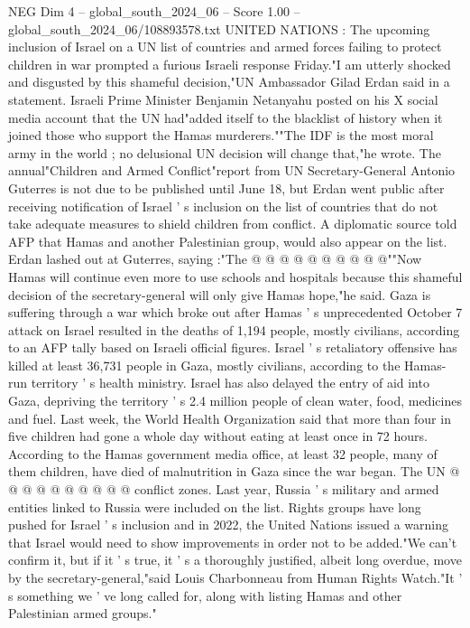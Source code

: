 \begin{textsample}{NEG Dim 4 – global\_south\_2024\_06 – Score 1.00 – global\_south\_2024\_06/108893578.txt}  \label{ex:f4_neg_377}
UNITED NATIONS : The upcoming inclusion of Israel on a UN list of countries and armed forces failing to protect children in war prompted a furious Israeli response Friday."I am utterly shocked and disgusted by this shameful decision,"UN Ambassador Gilad Erdan said in a statement.
Israeli Prime Minister Benjamin Netanyahu posted on his X social media account that the UN had"added itself to the blacklist of history when it joined those who support the Hamas murderers.""The IDF is the most moral army in the world ; no delusional UN decision will change that,"he wrote.
The annual"Children and Armed Conflict"report from UN Secretary-General Antonio Guterres is not due to be published until June 18, but Erdan went public after receiving notification of Israel ' s inclusion on the list of countries that do not take adequate measures to shield children from conflict.
A diplomatic source told AFP that Hamas and another Palestinian group, would also appear on the list.
Erdan lashed out at Guterres, saying :"The @ @ @ @ @ @ @ @ @ @""Now Hamas will continue even more to use schools and hospitals because this shameful decision of the secretary-general will only give Hamas hope,"he said.
Gaza is suffering through a war which broke out after Hamas ' s unprecedented October 7 attack on Israel resulted in the deaths of 1,194 people, mostly civilians, according to an AFP tally based on Israeli official figures.
Israel ' s retaliatory offensive has killed at least 36,731 people in Gaza, mostly civilians, according to the Hamas-run territory ' s health ministry.
Israel has also delayed the entry of aid into Gaza, depriving the territory ' s 2.4 million people of clean water, food, medicines and fuel.
Last week, the World Health Organization said that more than four in five children had gone a whole day without eating at least once in 72 hours.
According to the Hamas government media office, at least 32 people, many of them children, have died of malnutrition in Gaza since the war began.
The UN @ @ @ @ @ @ @ @ @ @ conflict zones.
Last year, Russia ' s military and armed entities linked to Russia were included on the list.
Rights groups have long pushed for Israel ' s inclusion and in 2022, the United Nations issued a warning that Israel would need to show improvements in order not to be added."We can't confirm it, but if it ' s true, it ' s a thoroughly justified, albeit long overdue, move by the secretary-general,"said Louis Charbonneau from Human Rights Watch."It ' s something we ' ve long called for, along with listing Hamas and other Palestinian armed groups."

\end{textsample}
